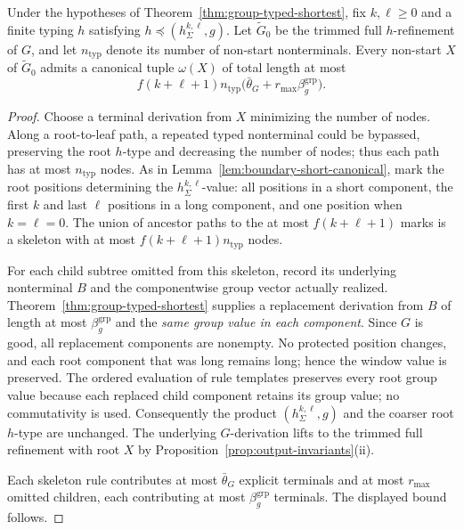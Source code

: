 \begin{lemma}
\label{lem:window-group-short}
Under the hypotheses of Theorem~\ref{thm:group-typed-shortest},
fix $k,\ell\ge0$ and a finite typing $h$ satisfying
$h\preceq(h_\Sigma^{k,\ell},g)$.
Let $\widetilde G_0$ be the trimmed full $h$-refinement
of $G$, and let $n_{\mathrm{typ}}$ denote its number of
non-start nonterminals.  Every non-start
$X$ of $\widetilde G_0$ admits a canonical tuple
$\omega(X)$ of total length at most
\[
 f(k+\ell+1)n_{\mathrm{typ}}
 \bigl(\bar\theta_G+r_{\max}\beta_g^{\mathrm{grp}}\bigr).
\]
\end{lemma}
\begin{proof}
Choose a terminal derivation from $X$ minimizing the
number of nodes.  Along a root-to-leaf path, a repeated
typed nonterminal could be bypassed, preserving the root
$h$-type and decreasing the number of nodes; thus
each path has at most $n_{\mathrm{typ}}$ nodes.
As in Lemma~\ref{lem:boundary-short-canonical},
mark the root positions determining the
$h_\Sigma^{k,\ell}$-value: all positions in a short
component, the first $k$ and last $\ell$ positions
in a long component, and one position when
$k=\ell=0$.  The union of ancestor paths to the
at most $f(k+\ell+1)$ marks is a skeleton with at most
$f(k+\ell+1)n_{\mathrm{typ}}$ nodes.

For each child subtree omitted from this skeleton,
record its underlying nonterminal $B$ and the
componentwise group vector actually realized.
Theorem~\ref{thm:group-typed-shortest} supplies
a replacement derivation from $B$ of length at most
$\beta_g^{\mathrm{grp}}$ and the \emph{same group
value in each component}.  Since $G$ is good,
all replacement components are nonempty.
No protected position changes, and each root
component that was long remains long; hence the
window value is preserved.  The ordered evaluation
of rule templates preserves every root group value
because each replaced child component retains its
group value; no commutativity is used.
Consequently the product $(h_\Sigma^{k,\ell},g)$
and the coarser root $h$-type are unchanged.
The underlying $G$-derivation lifts to the
trimmed full refinement with root $X$ by
Proposition~\ref{prop:output-invariants}(ii).

Each skeleton rule contributes at most
$\bar\theta_G$ explicit terminals and at most
$r_{\max}$ omitted children, each contributing at most
$\beta_g^{\mathrm{grp}}$ terminals.  The displayed
bound follows.
\end{proof}

